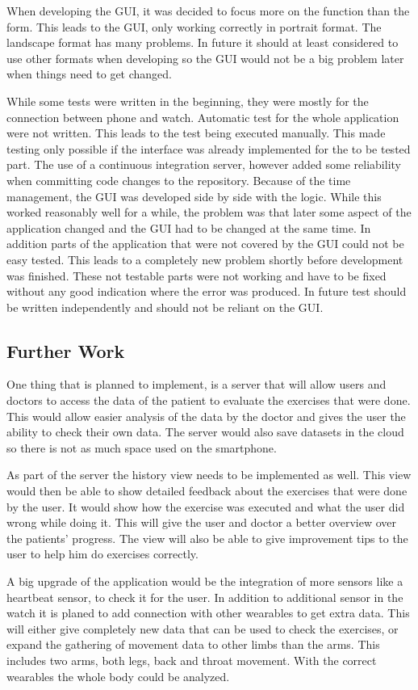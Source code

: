 When developing the GUI, it was decided to focus more on the function than the form. This leads to the GUI, only working correctly in portrait format. The landscape format has many problems. In future it should at least considered to use other formats when developing so the GUI would not be a big problem later when things need to get changed.

While some tests were written in the beginning, they were mostly for the connection between phone and watch. Automatic test for the whole application were not written. This leads to the test being executed manually. This made testing only possible if the interface was already implemented for the to be tested part. The use of a continuous integration server, however added some reliability when committing code changes to the repository.
Because of the time management, the GUI was developed side by side with the logic. While this worked reasonably well for a while, the problem was that later some aspect of the application changed and the GUI had to be changed at the same time.
In addition parts of the application that were not covered by the GUI could not be easy tested. This leads to a completely new problem shortly before development was finished. These not testable parts were not working and have to be fixed without any good indication where the error was produced.
In future test should be written independently and should not be reliant on the GUI.

\subsection{Further Work}
One thing that is planned to implement, is a server that will allow users and doctors to access the data of the patient to evaluate the exercises that were done. This would allow easier analysis of the data by the doctor and gives the user the ability to check their own data.
The server would also save datasets in the cloud so there is not as much space used on the smartphone.

As part of the server the history view needs to be implemented as well. This view would then be able to show detailed feedback about the exercises that were done by the user. It would show how the exercise was executed and what the user did wrong while doing it. This will give the user and doctor a better overview over the patients’ progress. The view will also be able to give improvement tips to the user to help him do exercises correctly.

A big upgrade of the application would be the integration of more sensors like a heartbeat sensor, to check it for the user. In addition to additional sensor in the watch it is planed to add connection with other wearables to get extra data. This will either give completely new data that can be used to check the exercises, or expand the gathering of movement data to other limbs than the arms. This includes two arms, both legs, back and throat movement. With the correct wearables the whole body could be analyzed.

